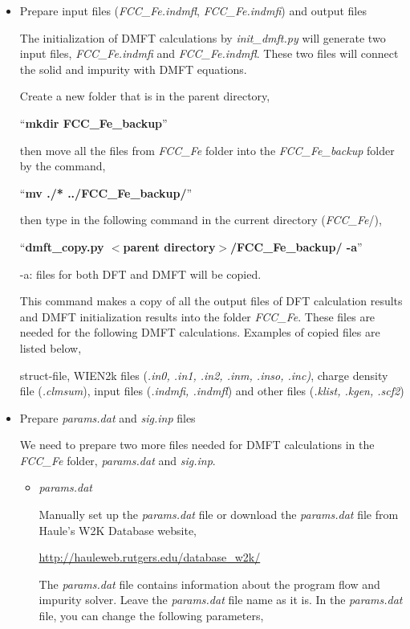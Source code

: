 \documentclass[12 pt]{article}
\begin{document}
	\begin{itemize}[leftmargin=0.2in]

	  \item Prepare input files (\emph{FCC\_Fe.indmfl}, \emph{FCC\_Fe.indmfi}) and output files

  The initialization of DMFT calculations by \emph{init\_dmft.py} will generate two input files, \emph{FCC\_Fe.indmfi} 
and \emph{FCC\_Fe.indmfl}. These two files will connect the solid and impurity with DMFT equations. 

  Create a new folder that is in the parent directory, 

  ``\textbf{mkdir FCC\_Fe\_backup}''

  then move all the files from \emph{FCC\_Fe} folder into the \emph{FCC\_Fe\_backup} folder by the command,

  ``\textbf{mv ./* ../FCC\_Fe\_backup/}''

  then type in the following command in the current directory (\emph{FCC\_Fe}/),

  ``\textbf{dmft\_copy.py $<$parent directory$>$/FCC\_Fe\_backup/ -a}''

  -a: files for both DFT and DMFT will be copied. 

  This command makes a copy of all the output files of DFT calculation results and DMFT initialization results 
into the folder \emph{FCC\_Fe}. These files are needed for the following DMFT calculations. Examples of copied 
files are listed below,

  struct-file, WIEN2k files (\emph{.in0, .in1, .in2, .inm, .inso, .inc)}, charge density file (\emph{.clmsum}), 
input files (\emph{.indmfi, .indmfl}) and other files (\emph{.klist, .kgen, .scf2})

	  \item Prepare \emph{params.dat} and \emph{sig.inp} files

  We need to prepare two more files needed for DMFT calculations in the \emph{FCC\_Fe} folder, \emph{params.dat} 
and \emph{sig.inp}. 

	    \begin{itemize}

	    \item \emph{params.dat}

  Manually set up the \emph{params.dat} file or download the \emph{params.dat} file from Haule's W2K Database website, 

  \url{http://hauleweb.rutgers.edu/database_w2k/}

  The \emph{params.dat} file contains information about the program flow and impurity solver. Leave the 
\emph{params.dat} file name as it is. In the \emph{params.dat} file, you can change the following parameters,


\end{itemize}
\end{itemize}
\end{document}
